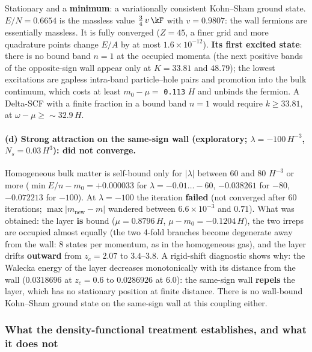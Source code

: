 Stationary and a \textbf{minimum}: a variationally consistent Kohn--Sham ground state. $E/N=0.6654$ is the
massless value $\tfrac34\,v\,\kF$ with $v=0.9807$: the wall fermions are essentially massless. It is fully
converged ($Z=45$, a finer grid and more quadrature points change $E/A$ by at most $1.6\times10^{-12}$).
\textbf{Its first excited state}: there is no bound band $n=1$ at the occupied momenta (the next positive
bands of the opposite-sign wall appear only at $K=33.81$ and $48.79$); the lowest excitations are gapless
intra-band particle--hole pairs and promotion into the bulk continuum, which costs at least
$m_0-\mu=$ \texttt{0.113} $H$  and unbinds the fermion. A Delta-SCF with a finite fraction
in a bound band $n=1$ would require $k\geq33.81$, at $\omega-\mu\geq{\sim}32.9\,H$.

\paragraph{(d) Strong attraction on the same-sign wall (exploratory; $\lambda=-100\,H^{-3}$,
$N_s=0.03\,H^3$): did not converge.} Homogeneous bulk matter is self-bound only for $|\lambda|$ between 60 and
80 $H^{-3}$ or more ($\min E/n-m_0=+0.000033$ for $\lambda=-0.01\dots-60$, $-0.038261$ for $-80$, $-0.072213$
for $-100$). At $\lambda=-100$ the iteration \textbf{failed} (not converged after 60 iterations;
$\max|m_{\mathrm{new}}-m|$ wandered between $6.6\times10^{-3}$ and $0.71$). What was obtained: the layer
\textbf{is} bound ($\mu=0.8796\,H$, $\mu-m_0=-0.1204\,H$), the two irreps are occupied almost equally (the two
4-fold branches become degenerate away from the wall: 8 states per momentum, as in the homogeneous gas),
and the layer drifts \textbf{outward} from $z_c=2.07$ to $3.4$--$3.8$. A rigid-shift diagnostic shows why:
the Walecka energy of the layer decreases monotonically with its distance from the wall ($0.0318696$ at
$z_c=0.6$ to $0.0286926$ at $6.0$): the same-sign wall \textbf{repels} the layer, which has no stationary
position at finite distance. There is no wall-bound Kohn--Sham ground state on the same-sign wall at this
coupling either.

\subsubsection{What the density-functional treatment establishes, and what it does not}
\label{sec:4.6.7}

